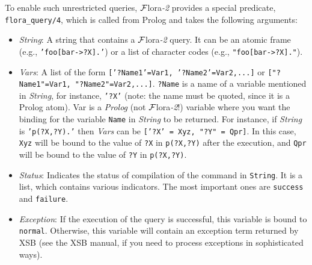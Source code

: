 \documentclass[11pt]{article}
\newcommand{\FLORA}{{\mbox{\sc ${\cal F}${lora}\rm\emph{-2}}}\xspace}
\newcommand{\FLSYSTEM}{\FLORA}
\begin{document}
To enable such unrestricted queries, \FLSYSTEM provides a special predicate,
{\tt flora\_query/4}, which is called from Prolog
and takes the following arguments: 
\begin{itemize}
  \item  \emph{String}: A string that contains a \FLSYSTEM query. It can be an
    atomic frame
    (e.g., {\tt 'foo[bar->?X].'}) or a list of character codes (e.g.,
    {\tt "foo[bar->?X]."}).
  \item \emph{Vars}: A list of the form {\tt ['?Name1'=Var1,
      '?Name2'=Var2,...]} or
    {\tt ["?Name1"=Var1, "?Name2"=Var2,...]}.
    {\tt ?Name} is a name of a variable mentioned in \emph{String}, for
    instance, {\tt '?X'} (note: the name must be quoted, since it is a
    Prolog atom).  Var is a \emph{Prolog} (not \FLSYSTEM!)
    variable where you want the binding for the variable
    {\tt Name} in \emph{String} to be returned.  For instance, if
    \emph{String} is {\tt 'p(?X,?Y).'} then \emph{Vars} can be {\tt ['?X' =
      Xyz, "?Y" = Qpr]}. In this case, {\tt Xyz} will be bound to the value
    of {\tt ?X} in {\tt p(?X,?Y)} after the execution, and {\tt Qpr} will be
    bound to the value of {\tt ?Y} in {\tt p(?X,?Y)}.
  \item \emph{Status}: Indicates the status of compilation of the command
    in {\tt String}.  It is a list, which contains various indicators.
    The most important ones are {\tt success} and {\tt failure}.
  \item \emph{Exception}: If the execution of the query is successful, this
    variable is bound to {\tt normal}. Otherwise, this variable will
    contain an exception term returned by XSB (see the XSB manual, if you
    need to process exceptions in sophisticated ways).
\end{itemize}
\end{document}

